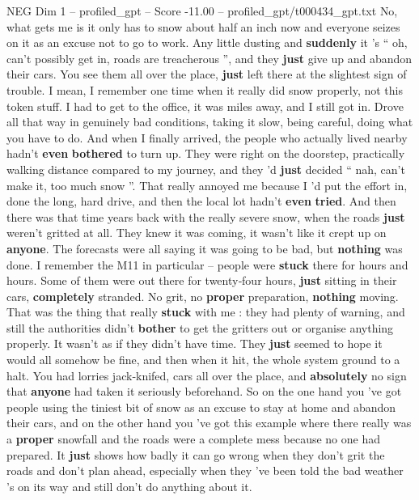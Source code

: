 \begin{textsample}{NEG Dim 1 – profiled\_gpt – Score -11.00 – profiled\_gpt/t000434\_gpt.txt}  \label{ex:f1_neg_001}
No, what gets me is it only has to snow about half an inch now and everyone seizes on it as an excuse not to go to work.
Any little dusting and \textbf{suddenly} it ’s “ oh, can't possibly get in, roads are treacherous ”, and they \textbf{just} give up and abandon their cars.
You see them all over the place, \textbf{just} left there at the slightest sign of trouble.
I mean, I remember one time when it really did snow properly, not this token stuff.
I had to get to the office, it was miles away, and I still got in.
Drove all that way in genuinely bad conditions, taking it slow, being careful, doing what you have to do.
And when I finally arrived, the people who actually lived nearby hadn't \textbf{even} \textbf{bothered} to turn up.
They were right on the doorstep, practically walking distance compared to my journey, and they ’d \textbf{just} decided “ nah, can't make it, too much snow ”.
That really annoyed me because I ’d put the effort in, done the long, hard drive, and then the local lot hadn't \textbf{even} \textbf{tried}.
And then there was that time years back with the really severe snow, when the roads \textbf{just} weren't gritted at all.
They knew it was coming, it wasn't like it crept up on \textbf{anyone}.
The forecasts were all saying it was going to be bad, but \textbf{nothing} was done.
I remember the M11 in particular – people were \textbf{stuck} there for hours and hours.
Some of them were out there for twenty‑four hours, \textbf{just} sitting in their cars, \textbf{completely} stranded.
No grit, no \textbf{proper} preparation, \textbf{nothing} moving.
That was the thing that really \textbf{stuck} with me : they had plenty of warning, and still the authorities didn't \textbf{bother} to get the gritters out or organise anything properly.
It wasn't as if they didn't have time.
They \textbf{just} seemed to hope it would all somehow be fine, and then when it hit, the whole system ground to a halt.
You had lorries jack‑knifed, cars all over the place, and \textbf{absolutely} no sign that \textbf{anyone} had taken it seriously beforehand.
So on the one hand you ’ve got people using the tiniest bit of snow as an excuse to stay at home and abandon their cars, and on the other hand you ’ve got this example where there really was a \textbf{proper} snowfall and the roads were a complete mess because no one had prepared.
It \textbf{just} shows how badly it can go wrong when they don't grit the roads and don't plan ahead, especially when they ’ve been told the bad weather ’s on its way and still don't do anything about it.

\end{textsample}
